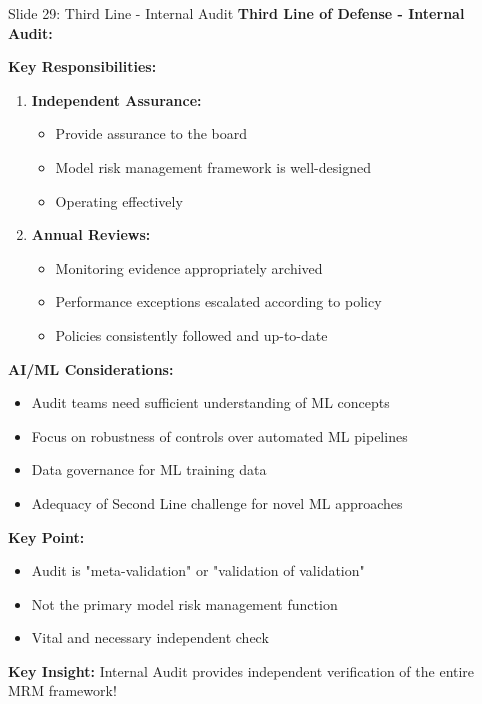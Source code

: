 \documentclass[8pt]{beamer}
\begin{document}
	\begin{frame}{Slide 29: Third Line - Internal Audit}
		\fontsize{6.5}{7.5}\selectfont
		\textbf{Third Line of Defense - Internal Audit:}
		
		\vspace{0.1cm}
		\textbf{Key Responsibilities:}
		\begin{enumerate}
			\item \textbf{Independent Assurance:}
			\begin{itemize}
				\item Provide assurance to the board
				\item Model risk management framework is well-designed
				\item Operating effectively
			\end{itemize}
			\item \textbf{Annual Reviews:}
			\begin{itemize}
				\item Monitoring evidence appropriately archived
				\item Performance exceptions escalated according to policy
				\item Policies consistently followed and up-to-date
			\end{itemize}
		\end{enumerate}
		
		\vspace{0.1cm}
		\textbf{AI/ML Considerations:}
		\begin{itemize}
			\item Audit teams need sufficient understanding of ML concepts
			\item Focus on robustness of controls over automated ML pipelines
			\item Data governance for ML training data
			\item Adequacy of Second Line challenge for novel ML approaches
		\end{itemize}
		
		\vspace{0.1cm}
		\textbf{Key Point:}
		\begin{itemize}
			\item Audit is "meta-validation" or "validation of validation"
			\item Not the primary model risk management function
			\item Vital and necessary independent check
		\end{itemize}
		
		\textcolor{myblue}{\textbf{Key Insight:}} Internal Audit provides \textcolor{myblue}{independent verification} of the entire MRM framework!
	\end{frame}
	
\end{document}
